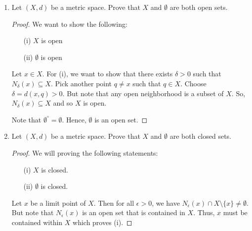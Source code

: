 \documentclass[a4paper]{article}
\begin{document}
\begin{enumerate}
\begin{proof}
            Thus, we conclude that 
            \[  E' = \{ (a,b) \in \R^{2} : a^{2} + b^{2} \leq 4  \}. \]
        \end{proof}
    \item Let \( (X,d)  \) be a metric space. Prove that \( X  \) and \( \emptyset  \) are both open sets.
        \begin{proof}
        We want to show the following: 
        \begin{enumerate}
            \item[(i)] \( X  \) is open 
            \item[(ii)] \( \emptyset \) is open
        \end{enumerate}
        Let \( x \in X \). For (i), we want to show that there exists \( \delta > 0 \) such that \( {N}_{\delta}(x) \subseteq X  \). Pick another point \( q \neq x  \) such that \( q \in X  \). Choose \( \delta =  d(x,q) > 0 \). But note that any open neighborhood is a subset of \( X  \). So, \( {N}_{\delta}(x) \subseteq X  \) and so \( X  \) is open. 
        
        Note that \( \emptyset^{\circ} = \emptyset \). Hence, \( \emptyset  \) is an open set.
        \end{proof}
    \item Let \( (X,d)  \) be a metric space. Prove that \( X  \) and \( \emptyset  \) are both closed sets.
        \begin{proof}
        We will proving the following statements: 
        \begin{enumerate}
            \item[(i)] \( X  \) is closed.
            \item[(ii)] \( \emptyset \) is closed.
        \end{enumerate}
        Let \( x  \) be a limit point of \( X  \). Then for all \( \epsilon > 0 \), we have \( {N}_{\epsilon}(x) \cap X \setminus  \{ x \} \neq \emptyset  \). But note that \( {N}_{\epsilon}(x) \) is an open set that is contained in \( X  \). Thus, \( x  \) must be contained within \( X  \) which proves (i).


\end{proof}
\end{enumerate}
\end{document}
